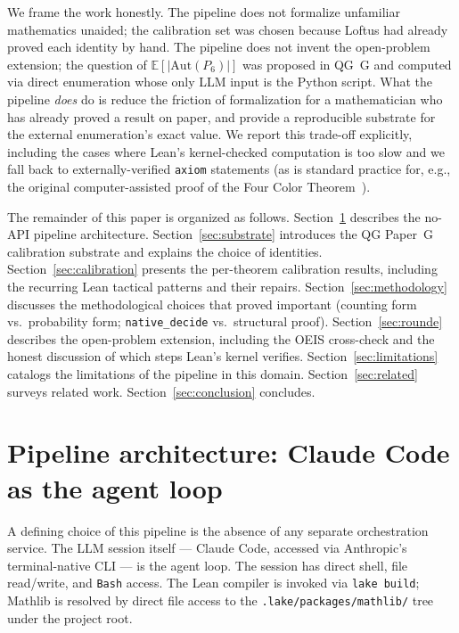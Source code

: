 \documentclass[11pt]{article}
\theoremstyle{definition}
\begin{document}
We frame the work honestly. The pipeline does not formalize unfamiliar mathematics
unaided; the calibration set was chosen because Loftus had already proved each
identity by hand. The pipeline does not invent the open-problem extension; the
question of $\mathbb{E}[|\mathrm{Aut}(P_6)|]$ was proposed in QG~G and computed via
direct enumeration whose only LLM input is the Python script. What the pipeline
\emph{does} do is reduce the friction of formalization for a mathematician who has
already proved a result on paper, and provide a reproducible substrate for the
external enumeration's exact value. We report this trade-off explicitly, including
the cases where Lean's kernel-checked computation is too slow and we fall back to
externally-verified \texttt{axiom} statements (as is standard practice for, e.g.,
the original computer-assisted proof of the Four Color Theorem~\cite{appel_haken}).

The remainder of this paper is organized as follows. Section~\ref{sec:pipeline}
describes the no-API pipeline architecture. Section~\ref{sec:substrate} introduces
the QG Paper~G calibration substrate and explains the choice of identities.
Section~\ref{sec:calibration} presents the per-theorem calibration results, including
the recurring Lean tactical patterns and their repairs. Section~\ref{sec:methodology}
discusses the methodological choices that proved important (counting form vs.\
probability form; \texttt{native\_decide} vs.\ structural proof). Section~\ref{sec:rounde}
describes the open-problem extension, including the OEIS cross-check and the
honest discussion of which steps Lean's kernel verifies. Section~\ref{sec:limitations}
catalogs the limitations of the pipeline in this domain. Section~\ref{sec:related}
surveys related work. Section~\ref{sec:conclusion} concludes.

\section{Pipeline architecture: Claude Code as the agent loop}\label{sec:pipeline}

A defining choice of this pipeline is the absence of any separate orchestration
service. The LLM session itself --- Claude Code, accessed via Anthropic's
terminal-native CLI --- is the agent loop. The session has direct shell, file
read/write, and \texttt{Bash} access. The Lean compiler is invoked via
\texttt{lake build}; Mathlib is resolved by direct file access to the
\texttt{.lake/packages/mathlib/} tree under the project root.
\end{document}
